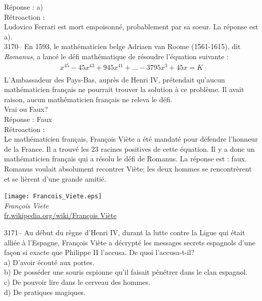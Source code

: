 \documentclass[letterpaper, 12pt]{article}
\begin{document}
R\'eponse : a)\\

R\'etroaction :\\
Ludovico Ferrari est mort empoisonn\'e, probablement par sa soeur. La r\'eponse est a).\\



3170-- En 1593, le math\'ematicien belge Adriaen van Roome (1561-1615), dit \emph{Romanus}, a lanc\'e le d\'efi math\'ematique de r\'esoudre l'\'equation suivante :
\begin{eqnarray*}
x^{45} - 45x^{43} + 945x^{41} + \dots - 3795x^3 + 45x = K\\
\end{eqnarray*}
L'Ambassadeur des Pays-Bas, aupr\`es de Henri IV, pr\'etendait qu'aucun math\'ematicien fran\c cais ne pourrait trouver la solution \`a ce probl\`eme. Il avait raison, aucun math\'ematicien fran\c cais ne releva le d\'efi.\\
Vrai ou Faux?\\

R\'eponse : Faux\\

R\'etroaction :\\
Le math\'ematicien fran\c cais, Fran\c cois Vi\`ete a \'et\'e mandat\'e pour d\'efendre l'honneur de la France. Il a trouv\'e les 23 racines positives de cette \'equation. Il y a donc un math\'ematicien fran\c cais qui a r\'esolu le d\'efi de Romanus. La r\'eponse est : faux. Romanus voulait absolument recontrer Vi\`ete; les deux hommes se rencontr\`erent et se li\`erent d'une grande amiti\'e.
\begin{center}
\texttt{[image: Francois\_Viete.eps]}\\
\emph{{\small Fran\c cois Viete}}\\
\href{http://fr.wikipedia.org/wiki/Fran\%C3\%A7ois_Vi\%C3\%A8te}{fr.wikipedia.org/wiki/Fran\c cois Vi\`ete}\\[5mm]
\end{center}



3171-- Au d\'ebut du r\`egne d'Henri IV, durant la lutte contre la Ligue qui \'etait alli\'ee \`a l'Espagne, Fran\c cois Vi\`ete a d\'ecrypt\'e les messages secrets espagnols d'une fa\c con si exacte que Philippe II l'accusa. De quoi l'accusa-t-il?\\

a) D'avoir \'ecout\'e aux portes.\\
b) De poss\'eder une souris espionne qu'il faisait p\'en\'etrer dans le clan espagnol.\\
c) De pouvoir lire dans le cerveau des hommes.\\
d) De pratiques magiques.\\
\end{document}
